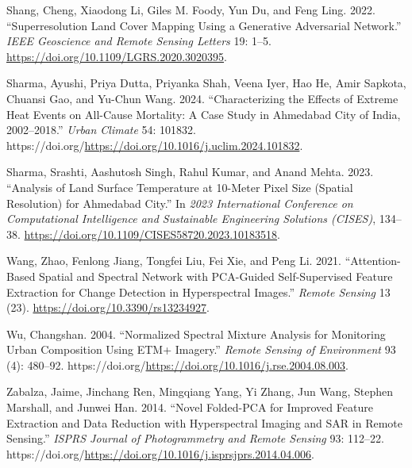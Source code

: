 \documentclass[
  letterpaper,
  DIV=11,
  numbers=noendperiod]{scrreprt}
\newlength{\cslhangindent}
\newenvironment{CSLReferences}[2] %
 {\begin{list}{}{%
  \setlength{\itemindent}{0pt}
  \setlength{\leftmargin}{0pt}
  \setlength{\parsep}{0pt}
  \ifodd #1
   \setlength{\leftmargin}{\cslhangindent}
   \setlength{\itemindent}{-1\cslhangindent}
  \fi
  \setlength{\itemsep}{#2\baselineskip}}}
 {\end{list}}
\begin{document}
\begin{CSLReferences}{1}{0}
Shang, Cheng, Xiaodong Li, Giles M. Foody, Yun Du, and Feng Ling. 2022.
{``Superresolution Land Cover Mapping Using a Generative Adversarial
Network.''} \emph{IEEE Geoscience and Remote Sensing Letters} 19: 1--5.
\url{https://doi.org/10.1109/LGRS.2020.3020395}.

Sharma, Ayushi, Priya Dutta, Priyanka Shah, Veena Iyer, Hao He, Amir
Sapkota, Chuansi Gao, and Yu-Chun Wang. 2024. {``Characterizing the
Effects of Extreme Heat Events on All-Cause Mortality: A Case Study in
Ahmedabad City of India, 2002--2018.''} \emph{Urban Climate} 54: 101832.
https://doi.org/\url{https://doi.org/10.1016/j.uclim.2024.101832}.

Sharma, Srashti, Aashutosh Singh, Rahul Kumar, and Anand Mehta. 2023.
{``Analysis of Land Surface Temperature at 10-Meter Pixel Size (Spatial
Resolution) for Ahmedabad City.''} In \emph{2023 International
Conference on Computational Intelligence and Sustainable Engineering
Solutions (CISES)}, 134--38.
\url{https://doi.org/10.1109/CISES58720.2023.10183518}.

Wang, Zhao, Fenlong Jiang, Tongfei Liu, Fei Xie, and Peng Li. 2021.
{``Attention-Based Spatial and Spectral Network with PCA-Guided
Self-Supervised Feature Extraction for Change Detection in Hyperspectral
Images.''} \emph{Remote Sensing} 13 (23).
\url{https://doi.org/10.3390/rs13234927}.

Wu, Changshan. 2004. {``Normalized Spectral Mixture Analysis for
Monitoring Urban Composition Using ETM+ Imagery.''} \emph{Remote Sensing
of Environment} 93 (4): 480--92.
https://doi.org/\url{https://doi.org/10.1016/j.rse.2004.08.003}.

Zabalza, Jaime, Jinchang Ren, Mingqiang Yang, Yi Zhang, Jun Wang,
Stephen Marshall, and Junwei Han. 2014. {``Novel Folded-PCA for Improved
Feature Extraction and Data Reduction with Hyperspectral Imaging and SAR
in Remote Sensing.''} \emph{ISPRS Journal of Photogrammetry and Remote
Sensing} 93: 112--22.
https://doi.org/\url{https://doi.org/10.1016/j.isprsjprs.2014.04.006}.

\end{CSLReferences}
\end{document}
